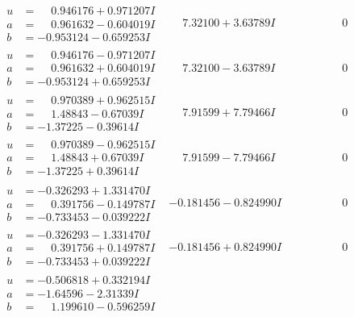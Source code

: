 \documentclass[1p]{elsarticle_modified}
\theoremstyle{definition}
\begin{document}
$$\begin{array}{c|c|c}
\begin{aligned}
u &= \phantom{-}0.946176 + 0.971207 I \\
a &= \phantom{-}0.961632 - 0.604019 I \\
b &= -0.953124 - 0.659253 I\end{aligned}
 & \phantom{-}7.32100 + 3.63789 I & \phantom{-0.000000 } 0 \\ \hline\begin{aligned}
u &= \phantom{-}0.946176 - 0.971207 I \\
a &= \phantom{-}0.961632 + 0.604019 I \\
b &= -0.953124 + 0.659253 I\end{aligned}
 & \phantom{-}7.32100 - 3.63789 I & \phantom{-0.000000 } 0 \\ \hline\begin{aligned}
u &= \phantom{-}0.970389 + 0.962515 I \\
a &= \phantom{-}1.48843 - 0.67039 I \\
b &= -1.37225 - 0.39614 I\end{aligned}
 & \phantom{-}7.91599 + 7.79466 I & \phantom{-0.000000 } 0 \\ \hline\begin{aligned}
u &= \phantom{-}0.970389 - 0.962515 I \\
a &= \phantom{-}1.48843 + 0.67039 I \\
b &= -1.37225 + 0.39614 I\end{aligned}
 & \phantom{-}7.91599 - 7.79466 I & \phantom{-0.000000 } 0 \\ \hline\begin{aligned}
u &= -0.326293 + 1.331470 I \\
a &= \phantom{-}0.391756 - 0.149787 I \\
b &= -0.733453 - 0.039222 I\end{aligned}
 & -0.181456 - 0.824990 I & \phantom{-0.000000 } 0 \\ \hline\begin{aligned}
u &= -0.326293 - 1.331470 I \\
a &= \phantom{-}0.391756 + 0.149787 I \\
b &= -0.733453 + 0.039222 I\end{aligned}
 & -0.181456 + 0.824990 I & \phantom{-0.000000 } 0 \\ \hline\begin{aligned}
u &= -0.506818 + 0.332194 I \\
a &= -1.64596 - 2.31339 I \\
b &= \phantom{-}1.199610 - 0.596259 I\end{aligned}

\end{array}$$
\end{document}
